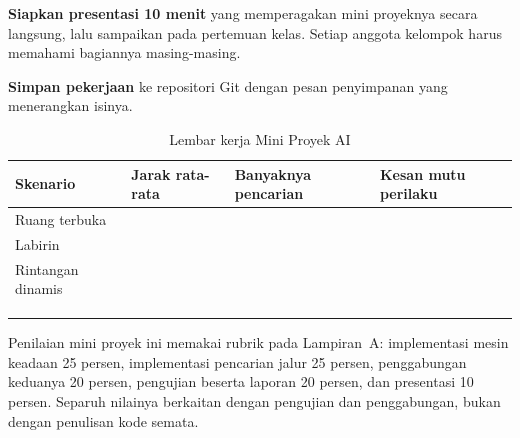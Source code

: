 \begin{praktikumbox}
\begin{langkah}
  \item \textbf{Siapkan presentasi 10 menit} yang memperagakan mini proyeknya
        secara langsung, lalu sampaikan pada pertemuan kelas. Setiap anggota
        kelompok harus memahami bagiannya masing-masing.

  \item \textbf{Simpan pekerjaan} ke repositori Git dengan pesan penyimpanan
        yang menerangkan isinya.
\end{langkah}
\end{praktikumbox}

\begin{table}[htbp]
\centering
\caption{Lembar kerja Mini Proyek AI}
\label{tab:lembar-mini-proyek}
{\setlength{\tabcolsep}{4pt}\footnotesize%
\begin{tabularx}{\textwidth}{@{}L{2.8cm} C{2.2cm} C{2.2cm} Y@{}}
\toprule
\headrow \textbf{Skenario} & \textbf{Jarak rata-rata} & \textbf{Banyaknya pencarian} & \textbf{Kesan mutu perilaku} \\
\midrule
Ruang terbuka & & & \\[1.6em]
\addlinespace
Labirin & & & \\[1.6em]
\addlinespace
Rintangan dinamis & & & \\[1.6em]
\addlinespace
{} \\[1.4em]
\addlinespace
{} \\[1.4em]
\addlinespace
{} \\[2.0em]
\bottomrule
\end{tabularx}}
\end{table}

\begin{catatabox}
Penilaian mini proyek ini memakai rubrik pada Lampiran~A: implementasi mesin
keadaan 25 persen, implementasi pencarian jalur 25 persen, penggabungan
keduanya 20 persen, pengujian beserta laporan 20 persen, dan presentasi
10 persen. Separuh nilainya berkaitan dengan pengujian dan
penggabungan, bukan dengan penulisan kode semata.
\end{catatabox}

